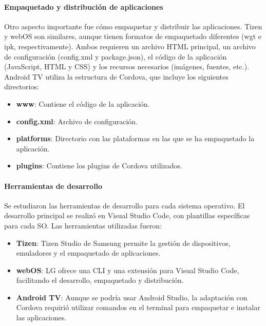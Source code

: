 \paragraph{Empaquetado y distribución de aplicaciones}
\label{par:analisis_estudio_sistemas_operativos_empaquetado}
Otro aspecto importante fue cómo empaquetar y distribuir las aplicaciones. Tizen y webOS son similares, aunque tienen formatos de empaquetado 
diferentes (wgt e ipk, respectivamente). Ambos requieren un archivo HTML principal, un archivo de configuración (config.xml y package.json), 
el código de la aplicación (JavaScript, HTML y CSS) y los recursos necesarios (imágenes, fuentes, etc.). Android TV utiliza la estructura de 
Cordova, que incluye los siguientes directorios:

\begin{itemize}
    \item \textbf{www}: Contiene el código de la aplicación.
    \item \textbf{config.xml}: Archivo de configuración.
    \item \textbf{platforms}: Directorio con las plataformas en las que se ha empaquetado la aplicación.
    \item \textbf{plugins}: Contiene los plugins de Cordova utilizados.
\end{itemize}

\paragraph{Herramientas de desarrollo}
\label{par:analisis_estudio_sistemas_operativos_herramientas_desarrollo}
Se estudiaron las herramientas de desarrollo para cada sistema operativo. El desarrollo principal se realizó en Visual Studio Code, con 
plantillas específicas para cada SO. Las herramientas utilizadas fueron:

\begin{itemize}
    \item \textbf{Tizen}: Tizen Studio de Samsung permite la gestión de dispositivos, emuladores y el empaquetado de aplicaciones.
    \item \textbf{webOS}: LG ofrece una CLI y una extensión para Visual Studio Code, facilitando el desarrollo, empaquetado y distribución.
    \item \textbf{Android TV}: Aunque se podría usar Android Studio, la adaptación con Cordova requirió utilizar comandos en el terminal para empaquetar e instalar las aplicaciones.
\end{itemize}

